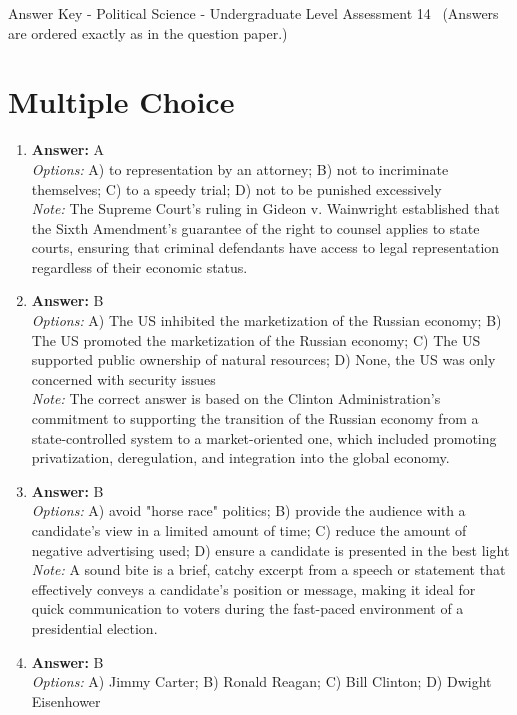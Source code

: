 \documentclass[12pt]{article}
\begin{document}
\begin{center}
Answer Key - Political Science - Undergraduate Level Assessment 14 \
\small (Answers are ordered exactly as in the question paper.)
\end{center}

\section*{Multiple Choice}
\begin{enumerate}[label=\arabic*.]
\item \textbf{Answer:} A
\\ \textit{Options:} A) to representation by an attorney; B) not to incriminate themselves; C) to a speedy trial; D) not to be punished excessively
\\ \textit{Note:} The Supreme Court's ruling in Gideon v. Wainwright established that the Sixth Amendment's guarantee of the right to counsel applies to state courts, ensuring that criminal defendants have access to legal representation regardless of their economic status.
\item \textbf{Answer:} B
\\ \textit{Options:} A) The US inhibited the marketization of the Russian economy; B) The US promoted the marketization of the Russian economy; C) The US supported public ownership of natural resources; D) None, the US was only concerned with security issues
\\ \textit{Note:} The correct answer is based on the Clinton Administration's commitment to supporting the transition of the Russian economy from a state-controlled system to a market-oriented one, which included promoting privatization, deregulation, and integration into the global economy.
\item \textbf{Answer:} B
\\ \textit{Options:} A) avoid "horse race" politics; B) provide the audience with a candidate's view in a limited amount of time; C) reduce the amount of negative advertising used; D) ensure a candidate is presented in the best light
\\ \textit{Note:} A sound bite is a brief, catchy excerpt from a speech or statement that effectively conveys a candidate's position or message, making it ideal for quick communication to voters during the fast-paced environment of a presidential election.
\item \textbf{Answer:} B
\\ \textit{Options:} A) Jimmy Carter; B) Ronald Reagan; C) Bill Clinton; D) Dwight Eisenhower

\end{enumerate}
\end{document}
